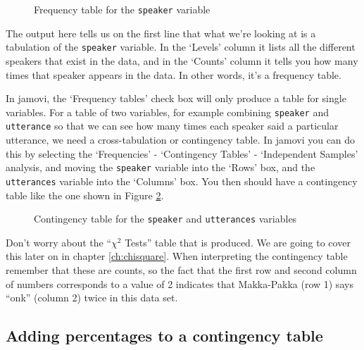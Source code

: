 \vspace{0.5cm}
\begin{figure}[htb]
\begin{center}
\caption{Frequency table for the \texttt{speaker} variable}
\label{fig:freqtable}
\end{center}
\end{figure}

The output here tells us on the first line that what we're looking at is a tabulation of the \texttt{speaker} variable. In the `Levels' column it lists all the different speakers that exist in the data, and in the `Counts' column it tells you how many times that speaker appears in the data. In other words, it's a frequency table. 

In jamovi, the `Frequency tables' check box will only produce a table for single variables. For a table of two variables, for example combining \texttt{speaker} and \texttt{utterance} so that we can see how many times each speaker said a particular utterance, we need a cross-tabulation or contingency table. In jamovi you can do this by selecting the `Frequencies' - `Contingency Tables' - `Independent Samples' analysis, and moving the \texttt{speaker} variable into the `Rows' box, and the \texttt{utterances} variable into the `Columns' box. You then should have a contingency table like the one shown in Figure \ref{fig:contingencytable}. 

\vspace{0.5cm}
\begin{figure}[htb]
\begin{center}
\caption{Contingency table for the \texttt{speaker} and \texttt{utterances} variables}
\label{fig:contingencytable}
\end{center}
\end{figure}

Don't worry about the ``$\chi^2$ Tests'' table that is produced. We are going to cover this later on in chapter \ref{ch:chisquare}. When interpreting the contingency table remember that these are counts, so the fact that the first row and second column of numbers corresponds to a value of 2 indicates that Makka-Pakka (row 1) says ``onk'' (column 2) twice in this data set. 

\subsection{Adding percentages to a contingency table}

